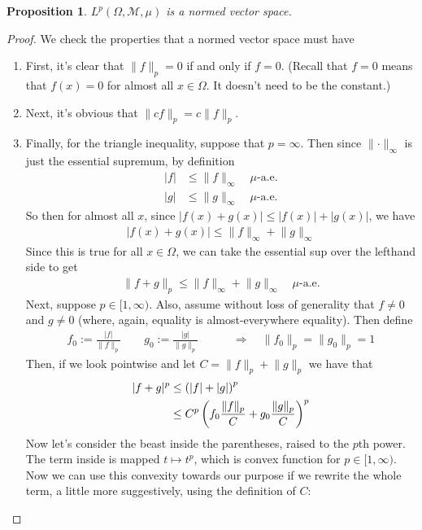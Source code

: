 \documentclass[12pt]{article}
\theoremstyle{plain}
\newtheorem{prop}[thm]{Proposition}
\theoremstyle{definition}
\theoremstyle{remark}
\begin{document}
\begin{prop}
$L^p(\Omega,\mathscr{M},\mu)$ is a normed vector space.
\end{prop}
\begin{proof}
We check the properties that a normed vector space must have
\begin{enumerate}
    \item First, it's clear that $\lVert f\rVert_p=0$ if and only if $f=0$. (Recall that $f=0$ means that $f(x)=0$ for almost all $x\in\Omega$. It doesn't need to be the constant.)
    \item Next, it's obvious that $\lVert cf\rVert_p = c\lVert f\rVert_p$.
\item Finally, for the triangle inequality, suppose that $p=\infty$. Then since $\lVert \cdot\rVert_\infty$ is just the essential supremum, by definition
\begin{align*}
    |f|&\leq \lVert f\rVert_\infty
    \quad \text{$\mu$-a.e.}\\
    |g|&\leq \lVert g\rVert_\infty 
    \quad \text{$\mu$-a.e.}
\end{align*}
So then for almost all $x$, since $|f(x)+g(x)|\leq |f(x)|+|g(x)|$, we have
\begin{align*}
    |f(x)+g(x)|\leq \lVert f\rVert_\infty 
    + \lVert g\rVert_\infty
\end{align*}
Since this is true for all $x\in\Omega$, we can take the essential sup over the lefthand side to get
\begin{align*}
    \lVert f+g\rVert_p
    \leq \lVert f\rVert_\infty 
    + \lVert g\rVert_\infty
    \quad \text{$\mu$-a.e.}
\end{align*}
Next, suppose $p\in[1,\infty)$. Also, assume without loss of generality that $f\neq 0$ and $g\neq 0$ (where, again, equality is almost-everywhere equality). Then define
\begin{align*}
    f_0 := \frac{|f|}{\lVert f\rVert_p}
    \qquad
    g_0 := \frac{|g|}{\lVert g\rVert_p}
    \qquad 
    \quad\Rightarrow\quad
    \lVert f_0\rVert_p
    =\lVert g_0\rVert_p
    =1
\end{align*}
Then, if we look pointwise and let $C=\lVert f\rVert_p+\lVert g\rVert_p$ we have that
\begin{align}
    |f+g|^p&\leq \left(|f|+|g|\right)^p\notag\\
    &\leq C^p\left(f_0\frac{\lVert f\rVert_p}{C}
    + g_0\frac{\lVert g\rVert_p}{C}\right)^p
    \label{convstep}
\end{align}
Now let's consider the beast inside the parentheses, raised to the $p$th power. The term inside is mapped $t\mapsto t^p$, which is convex function for $p\in[1,\infty)$. Now we can use this convexity towards our purpose if we rewrite the whole term, a little more suggestively, using the definition of $C$:

\end{enumerate}
\end{proof}
\end{document}
